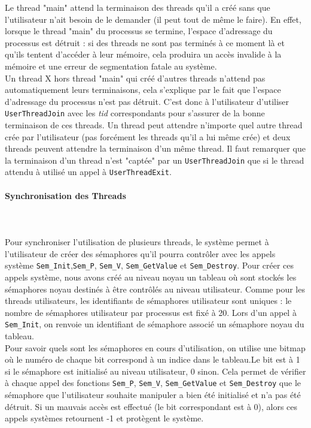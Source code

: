 \documentclass{report}
\newcommand{\myparagraph}[1]{\paragraph*{#1}\mbox{}\\}
\begin{document}
Le thread "main" attend la terminaison des threads qu'il a créé sans que l'utilisateur n'ait besoin de le demander (il peut tout de même le faire). En effet, lorsque le thread "main" du processus se termine, l'espace d'adressage du processus est détruit : si des threads ne sont pas terminés à ce moment là et qu'ils tentent d'accéder à leur mémoire, cela produira un accès invalide à la mémoire et une erreur de segmentation fatale au système.\\
Un thread X hors thread "main" qui créé d'autres threads n'attend pas automatiquement leurs terminaisons, cela s'explique par le fait que l'espace d'adressage du processus n'est pas détruit. C'est donc à l'utilisateur d'utiliser \texttt{UserThreadJoin} avec les \textit{tid} correspondants pour s'assurer de la bonne terminaison de ces threads. Un thread peut attendre n'importe quel autre thread crée par l'utilisateur (pas forcément les threads qu'il a lui même crée) et deux threads peuvent attendre la terminaison d'un même thread. Il faut remarquer que la terminaison d'un thread n'est "captée" par un \texttt{UserThreadJoin} que si le thread attendu à utilisé un appel à \texttt{UserThreadExit}.
 

\myparagraph{Synchronisation des Threads}\\
Pour synchroniser l'utilisation de plusieurs threads, le système permet à l'utilisateur de créer des sémaphores qu'il pourra contrôler avec les appels système \texttt{Sem\_Init},\texttt{Sem\_P}, \texttt{Sem\_V}, \texttt{Sem\_GetValue} et \texttt{Sem\_Destroy}. Pour créer ces appels système, nous avons créé au niveau noyau un tableau où sont stockés les sémaphores noyau destinés à être contrôlés au niveau utilisateur. Comme pour les threads utilisateurs, les identifiants de sémaphores utilisateur sont uniques : le nombre de sémaphores utilisateur par processus est fixé à 20. Lors d'un appel à \texttt{Sem\_Init}, on renvoie un identifiant de sémaphore associé un sémaphore noyau du tableau. \\

Pour savoir quels sont les sémaphores en cours d'utilisation, on utilise une bitmap où le numéro de chaque bit correspond à un indice dans le tableau.Le bit est à 1 si le sémaphore est initialisé au niveau utilisateur, 0 sinon. Cela permet de vérifier à chaque appel des fonctions \texttt{Sem\_P}, \texttt{Sem\_V}, \texttt{Sem\_GetValue} et \texttt{Sem\_Destroy} que le sémaphore que l'utilisateur souhaite manipuler a bien été initialisé et n'a pas été détruit. Si un mauvais accès est effectué (le bit correspondant est à 0), alors ces appels systèmes retournent -1 et protègent le système.
 
\end{document}
